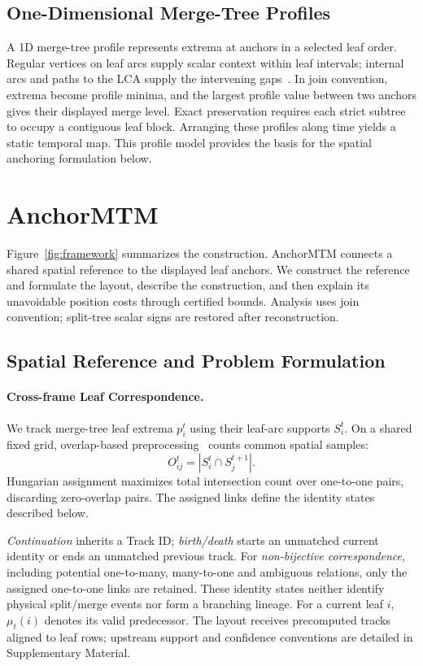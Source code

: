 \documentclass[review]{vgtc}
\begin{document}
\subsection{One-Dimensional Merge-Tree Profiles}
A 1D merge-tree profile represents extrema at anchors in a selected leaf order. Regular vertices on leaf arcs supply scalar context within leaf intervals; internal arcs and paths to the LCA supply the intervening gaps~\cite{Koepp:2023:TMTM,STMTM:2026}. In join convention, extrema become profile minima, and the largest profile value between two anchors gives their displayed merge level. Exact preservation requires each strict subtree to occupy a contiguous leaf block. Arranging these profiles along time yields a static temporal map. This profile model provides the basis for the spatial anchoring formulation below.




\section{AnchorMTM}\label{sec:method}
Figure~\ref{fig:framework} summarizes the construction. AnchorMTM connects a shared spatial reference to the displayed leaf anchors. We construct the reference and formulate the layout, describe the construction, and then explain its unavoidable position costs through certified bounds. Analysis uses join convention; split-tree scalar signs are restored after reconstruction.

\subsection{Spatial Reference and Problem Formulation}\label{sec:reference}
\paragraph{Cross-frame Leaf Correspondence.}
We track merge-tree leaf extrema $p_i^t$ using their leaf-arc supports $S_i^t$. On a shared fixed grid, overlap-based preprocessing~\cite{STMTM:2026} counts common spatial samples:
\begin{equation}\label{eq:overlap}
 O_{ij}^t=|S_i^t\cap S_j^{t+1}|.
\end{equation}
Hungarian assignment maximizes total intersection count over one-to-one pairs, discarding zero-overlap pairs. The assigned links define the identity states described below.

\emph{Continuation} inherits a Track ID; \emph{birth/death} starts an unmatched current identity or ends an unmatched previous track. For \emph{non-bijective correspondence}, including potential one-to-many, many-to-one and ambiguous relations, only the assigned one-to-one links are retained. These identity states neither identify physical split/merge events nor form a branching lineage. For a current leaf $i$, $\mu_t(i)$ denotes its valid predecessor. The layout receives precomputed tracks aligned to leaf rows; upstream support and confidence conventions are detailed in Supplementary Material.
\end{document}
